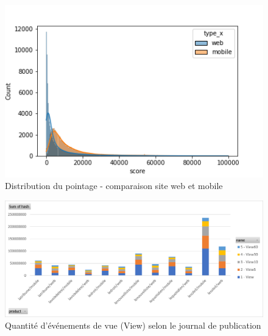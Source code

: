 \documentclass[french]{article}
\begin{document}
\begin{figure}[H]
\centering
\includegraphics[width=\textwidth]{gr002.png} 
\caption{Distribution du pointage - comparaison site web et mobile}
\label{fig:graph_pointagewebmobile}
\end{figure}


\begin{figure}[H]
\centering
\includegraphics[width=1.05\textwidth]{views.png} 
\caption{Quantité d'événements de vue (View) selon le journal de publication}
\label{fig:graph_mobile_views_repartition}
\end{figure}


\end{document}
